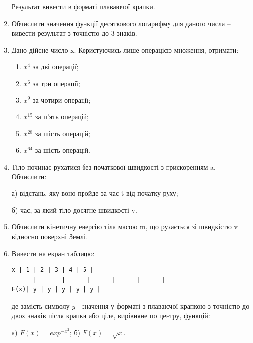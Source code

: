 \documentclass[]{article}
\makeatletter
\newcommand{\xslalph}[1]{\expandafter\@xslalph\csname c@#1\endcsname}
\newcommand{\@xslalph}[1]{%
    \ifcase#1\or а\or б\or в\or г\or д\or e\or є\or ж\or з\or i%
    \or й\or к\or л\or м\or н\or о\or п\or р\or с\or т%
    \or у\or ф\or х\or ц\or ч\or ш\or ю\or я\or аа\or бб\or вв %
    \else\@ctrerr\fi%
}
\makeatother
\begin{document}
\begin{enumerate}
Результат вивести в форматі плаваючої крапки.
\item
Обчислити значення функції десяткового логарифму для даного числа --
вивести результат з точністю до 3 знаків.
\item
Дано дійсне число x. Користуючись лише операцією множення, отримати:
\begin{multicols}{2}
\begin{enumerate}[label=\xslalph*)]
\item \(x^{4}\) за дві операції;
\item \(x^{6}\) за три операції;
\item \(x^{9}\) за чотири операції;
\item \(x^{15}\) за п'ять операцій;
\item \(x^{28}\) за шість операцій;
\item \(x^{64}\) за шість операцій.
\end{enumerate}
\end{multicols}

\item
Тіло починає рухатися без початкової швидкості з прискоренням a.
Обчислити:

а) відстань, яку воно пройде за час t від початку руху;

б) час, за який тіло досягне швидкості v.

\item
Обчислити кінетичну енергію тіла масою m, що рухається зі швидкістю v
відносно поверхні Землі.
\item
Вивести на екран таблицю:
\begin{verbatim}
x | 1 | 2 | 3 | 4 | 5 |
------|-------|------|------|------|------|
F(x)| y | y | y | y | y |
\end{verbatim}

де замість символу $y$ - значення у форматі з плаваючої крапкою з точністю
до двох знаків після крапки або ціле, вирівняне по центру, функцій:

а) $F(x) = exp^{-x^{2}}$; б) $F(x)= \sqrt{x}$.
\end{enumerate}
\end{document}
